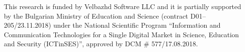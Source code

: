 \documentclass[graybox]{svmult}
\begin{document}
\begin{acknowledgement}
This research is funded by Velbazhd Software LLC and it is partially supported by the Bulgarian Ministry of Education and Science (contract D01–205/23.11.2018) under the National Scientific Program ``Information and Communication Technologies for a Single Digital Market in Science, Education and Security (ICTinSES)'', approved by DCM \# 577/17.08.2018.
\end{acknowledgement}


\end{document}
